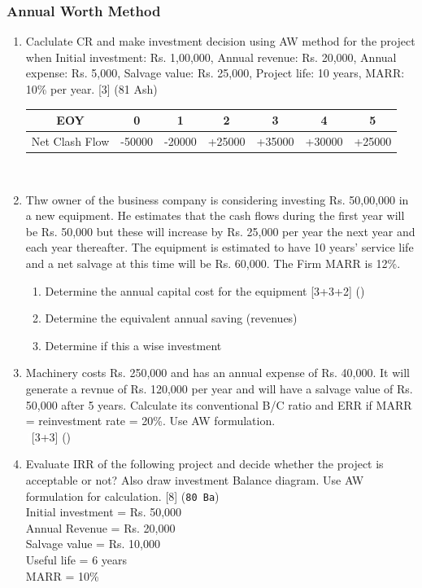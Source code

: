 \documentclass[12pt]{article}
\newcommand{\enter}{\\\textcolor{white}{1}}
\begin{document}
\subsubsection{Annual Worth Method}
\begin{enumerate}[noitemsep, topsep = 0pt]
	\item Caclulate CR and make investment decision using AW method for the project when Initial investment: Rs. 1,00,000, Annual revenue: Rs. 20,000, Annual expense: Rs. 5,000, Salvage value: Rs. 25,000, Project life: 10 years, MARR: 10\% per year. \hfill [3] (81 Ash)\\
	\begin{tabular}{|c|c|c|c|c|c|c|}
		\hline
		EOY & 0 & 1 & 2 & 3 & 4 & 5\\ \hline
		Net Clash Flow & -50000 & -20000 & +25000 & +35000 & +30000 & +25000\\ 
		\hline
	\end{tabular}\\[0pt]
	
	\item Thw owner of the business company is considering investing Rs. 50,00,000 in a new equipment. He estimates that the cash flows during the first year will be Rs. 50,000 but these will increase by Rs. 25,000 per year the next year and each year thereafter. The equipment is estimated to have 10 years' service life and a net salvage at this time will be Rs. 60,000. The Firm MARR is 12\%.
	\begin{enumerate}[noitemsep, topsep = 0pt, label = \alph*]
		\item Determine the annual capital cost for the equipment \hfill [3+3+2] ()
		\item Determine the equivalent annual saving (revenues)
		\item Determine if this a wise investment
	\end{enumerate}
	
	\item Machinery costs Rs. 250,000 and has an annual expense of Rs. 40,000. It will generate a revnue of Rs. 120,000 per year and will have a salvage value of Rs. 50,000 after 5 years. Calculate its conventional B/C ratio and ERR if MARR = reinvestment rate = 20\%. Use AW formulation. \enter\hfill [3+3] ()
	
	\item Evaluate IRR of the following project and decide whether the project is acceptable or not? Also draw investment Balance diagram. Use AW formulation for calculation. \hfill [8] (\texttt{80 Ba})\\
	Initial investment = Rs. 50,000\\
	Annual Revenue = Rs. 20,000\\
	Salvage value = Rs. 10,000\\
	Useful life = 6 years\\
	MARR = 10\%
	

\end{enumerate}
\end{document}

